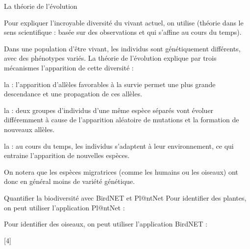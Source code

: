 \begin{doc}{La théorie de l'évolution}
  
  Pour expliquer l'incroyable diversité du vivant actuel, on utilise  (théorie dans le sens scientifique : basée sur des observations et qui s'affine au cours du temps). 

  Dans une population d'être vivant, les individus sont génétiquement différents, avec des phénotypes variés.
  La théorie de l'évolution explique par trois mécanismes l'apparition de cette diversité :

  \begin{listePoints}
    \item la  : l'apparition d'allèles favorables à la survie permet une plus grande descendance et une propagation de ces allèles.
    \item la  : deux groupes d'individus d'une même espèce séparés vont évoluer différemment à cause de l'apparition aléatoire de mutations et la formation de nouveaux allèles.
    \item la  : au cours du temps, les individus s'adaptent à leur environnement, ce qui entraine l'apparition de nouvelles espèces.
  \end{listePoints}

  On notera que les espèces migratrices (comme les humains ou les oiseaux) ont donc en général moins de variété génétique.
\end{doc}

\begin{doc}{Quantifier la biodiversité avec BirdNET et Pl@ntNet}
  Pour identifier des plantes, on peut utiliser l'application Pl@ntNet :
  \begin{center}
  \end{center}

  Pour identifier des oiseaux, on peut utiliser l'application BirdNET :

  \begin{center}   
  \end{center}
\end{doc}


[4]

